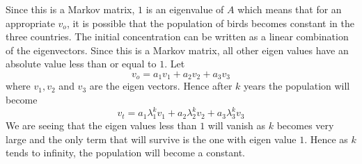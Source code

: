 \documentclass[solution,addpoints,12pt]{exam}
\newenvironment{Solution}{\begin{solution}}{\end{solution}}
\begin{document}
\begin{questions}
\begin{parts}
\begin{Solution}
    Since this is a Markov matrix, $1$ is an eigenvalue of $A$ which means that for an appropriate $v_{o}$, it is possible that the population of birds becomes constant in the three countries. \newline
    The initial concentration can be written as a linear combination of the eigenvectors. Since this is a Markov matrix, all other eigen values have an absolute value less than or equal to $1$. Let
    \[v_{o} = a_{1}v_{1} + a_{2}v_{2} + a_{3}v_{3}\]
    where $v_{1}, v_{2}$ and $v_{3}$ are the eigen vectors. Hence after $k$ years the population will become
    \[v_{t} = a_{1}\lambda_{1}^{k}v_{1} + a_{2}\lambda_{2}^{k}v_{2} + a_{3}\lambda_{3}^{k}v_{3}\]
    We are seeing that the eigen values less than $1$ will vanish as $k$ becomes very large and the only term that will survive is the one with eigen value $1$. Hence as $k$ tends to infinity, the population will become a constant.
    \end{Solution}
\end{parts}


\question
{}
\end{questions}
\end{document}
